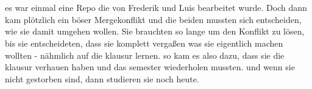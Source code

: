 
\newcommand{\germanQuote}[1]{„\textit{#1}“}
\newcommand{\englishQuote}[1]{``\textit{#1}''}



\chapter{\chapterOne}
es war einmal eine Repo die von Frederik und Luis bearbeitet wurde.
Doch dann kam plötzlich ein böser Mergekonflikt und die beiden mussten sich entscheiden, wie sie damit umgehen wollen.
Sie brauchten so lange um den Konflikt zu lösen, bis sie entscheideten, dass sie komplett vergaßen was sie eigentlich machen wollten - nähmlich auf die klausur lernen.
so kam es also dazu, dass sie die klausur verhauen haben und das semester wiederholen mussten.
und wenn sie nicht gestorben sind, dann studieren sie noch heute.

